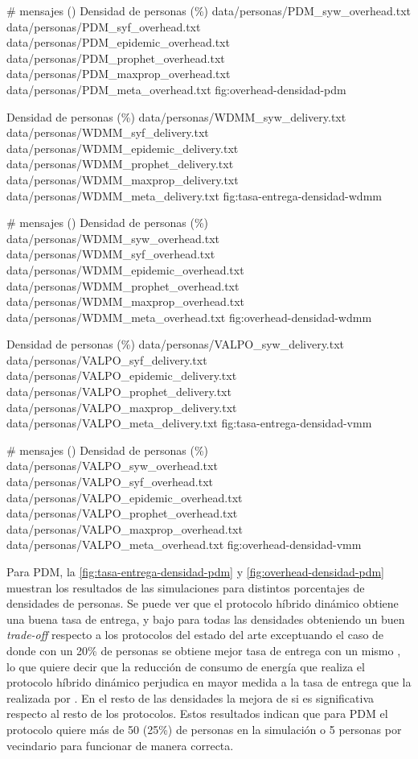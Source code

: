 {
\graficoProtocolos
{\# mensajes (\overhead)}
{Densidad de personas (\%)}
{data/personas/PDM_syw_overhead.txt}
{data/personas/PDM_syf_overhead.txt}
{data/personas/PDM_epidemic_overhead.txt}
{data/personas/PDM_prophet_overhead.txt}
{data/personas/PDM_maxprop_overhead.txt}
{data/personas/PDM_meta_overhead.txt}
}{fig:overhead-densidad-pdm}


{
\graficoDeliveryProtocolos
{Densidad de personas (\%)}
{data/personas/WDMM_syw_delivery.txt}
{data/personas/WDMM_syf_delivery.txt}
{data/personas/WDMM_epidemic_delivery.txt}
{data/personas/WDMM_prophet_delivery.txt}
{data/personas/WDMM_maxprop_delivery.txt}
{data/personas/WDMM_meta_delivery.txt}
}{fig:tasa-entrega-densidad-wdmm}


{
\graficoProtocolos
{\# mensajes (\overhead)}
{Densidad de personas (\%)}
{data/personas/WDMM_syw_overhead.txt}
{data/personas/WDMM_syf_overhead.txt}
{data/personas/WDMM_epidemic_overhead.txt}
{data/personas/WDMM_prophet_overhead.txt}
{data/personas/WDMM_maxprop_overhead.txt}
{data/personas/WDMM_meta_overhead.txt}
}{fig:overhead-densidad-wdmm}


{
\graficoDeliveryProtocolos
{Densidad de personas (\%)}
{data/personas/VALPO_syw_delivery.txt}
{data/personas/VALPO_syf_delivery.txt}
{data/personas/VALPO_epidemic_delivery.txt}
{data/personas/VALPO_prophet_delivery.txt}
{data/personas/VALPO_maxprop_delivery.txt}
{data/personas/VALPO_meta_delivery.txt}
}{fig:tasa-entrega-densidad-vmm}


{
\graficoProtocolos
{\# mensajes (\overhead)}
{Densidad de personas (\%)}
{data/personas/VALPO_syw_overhead.txt}
{data/personas/VALPO_syf_overhead.txt}
{data/personas/VALPO_epidemic_overhead.txt}
{data/personas/VALPO_prophet_overhead.txt}
{data/personas/VALPO_maxprop_overhead.txt}
{data/personas/VALPO_meta_overhead.txt}
}{fig:overhead-densidad-vmm}


Para PDM, la \ref{fig:tasa-entrega-densidad-pdm} y
\ref{fig:overhead-densidad-pdm} muestran los resultados de las simulaciones para
distintos porcentajes de densidades de personas. Se puede ver que el protocolo
híbrido dinámico obtiene una buena tasa de entrega, y bajo \overhead{} para
todas las densidades obteniendo un buen \textit{trade-off} respecto a los
protocolos del estado del arte exceptuando el caso de \syf{} donde con un  20\%
de personas se obtiene mejor tasa de entrega con un mismo \overhead, lo que
quiere decir que la reducción de consumo de energía que realiza el protocolo
híbrido dinámico perjudica en mayor medida a la tasa de entrega que la realizada
por \syf. En el resto de las densidades la mejora de \overhead{} si es
significativa respecto al resto de los protocolos.  Estos resultados indican que
para PDM el protocolo quiere más de 50 (25\%) de personas en la simulación o 5
personas por vecindario para funcionar de manera correcta.

